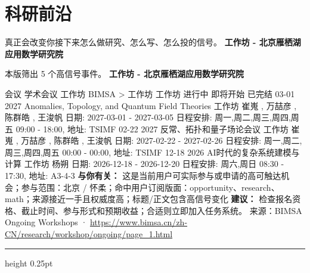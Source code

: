 \documentclass[10.5pt]{ctexart}
\begin{document}
\section*{科研前沿}
{\color{ormuted} 真正会改变你接下来怎么做研究、怎么写、怎么投的信号。}
\vspace{2mm}
{\LARGE\bfseries 工作坊 - 北京雁栖湖应用数学研究院}\par
\vspace{1mm}
{\color{ormuted} 本版筛出 5 个高信号事件。}
\vspace{3mm}
{\Large\bfseries 工作坊 - 北京雁栖湖应用数学研究院}\par
会议 学术会议 工作坊 BIMSA > 工作坊 工作坊 进行中 即将开始 已完结 03-01 2027 Anomalies, Topology, and Quantum Field Theories 工作坊 崔嵬 , 万喆彦 , 陈群皓 , 王浚帆 日期: 2027-03-01 - 2027-03-05 日程安排: 周一,周二,周三,周四,周五 09:00 - 18:00, 地址: TSIMF 02-22 2027 反常、拓扑和量子场论会议 工作坊 崔嵬 , 万喆彦 , 陈群皓 , 王浚帆 日期: 2027-02-22 - 2027-02-26 日程安排: 周一,周二,周三,周四,周五 00:00 - 00:00, 地址: TSIMF 12-18 2026 AI时代的复杂系统建模与计算 工作坊 杨朔 日期: 2026-12-18 - 2026-12-20 日程安排: 周六,周日 08:30 - 17:30, 地址: A3-4-3
\textbf{与你有关：} 这是当前用户可实际参与或申请的高可触达机会；参与范围：北京 / 怀柔；命中用户订阅版面：opportunity、research、math；来源接近一手且权威度高；标题/正文包含高信号变化
\textbf{建议：} 检查报名资格、截止时间、参与形式和预期收益；合适则立即加入任务系统。
{\footnotesize\color{ormuted} 来源：BIMSA Ongoing Workshops · \url{https://www.bimsa.cn/zh-CN/research/workshop/ongoing/page_1.html}}
\vspace{4mm}
\hrule height 0.25pt
\vspace{3mm}
\end{document}
